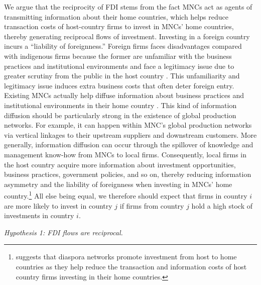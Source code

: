 \documentclass[reqno,onecolumn,letterpaper,12pt]{article}
\begin{document}
We argue that the reciprocity of FDI stems from the fact %
MNCs act as agents of transmitting information about their home countries, which helps reduce transaction costs of host-country firms to invest in MNCs' home countries, thereby generating reciprocal flows of investment. Investing in a foreign country incurs a ``liability of foreignness.'' Foreign firms faces disadvantages compared with indigenous firms because the former are unfamiliar with the business practices and institutional environments and face a legitimacy issue due to greater scrutiny from the public in the host country \citep{Zaheer:1995,Kostova_Zaheer:1999,Hymer:1976}. This unfamiliarity and legitimacy issue induces extra business costs that often deter foreign entry. Existing MNCs actually help diffuse information about business practices and institutional environments in their home country \citep{Kwok_Tadesse:2006,Sandholtz_Gray:2003,Simmons_Elkins:2004}. This kind of information diffusion should be particularly strong in the existence of global production networks. For example, it can happen within MNC's global production networks via vertical linkages to their upstream suppliers and downstream customers. More generally, information diffusion can occur through the spillover of knowledge and management know-how from MNCs to local firms. Consequently, local firms in the host country acquire more information about investment opportunities, business practices, government policies, and so on, thereby reducing information asymmetry and the liability of foreignness when investing in MNCs' home country.\footnote{\citet{Leblang:2010} suggests that diaspora networks promote investment from host to home countries as they help reduce the transaction and information costs of host country firms investing in their home countries.} All else being equal, we therefore should expect that firms in country $i$ are more likely to invest in country $j$ if firms from country $j$ hold a high stock of investments in country $i$.


\begin{center}
\textit{Hypothesis 1: FDI flows are reciprocal.}
\end{center}
\end{document}
